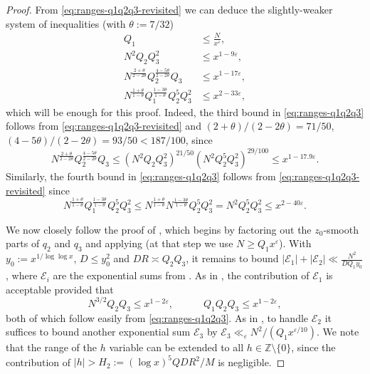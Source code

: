 \documentclass[reqno,11pt]{amsart}
\theoremstyle{remark}
\numberwithin{equation}{section}
\newcommand{\Z}{\mathbb{Z}}
\newcommand{\msE}{\mathscr{E}}
\newcommand{\eps}{\varepsilon}
\begin{document}
\begin{proof}
From \cref{eq:ranges-q1q2q3-revisited} we can deduce the slightly-weaker system of inequalities (with $\theta := 7/32$)
\begin{equation} \label{eq:ranges-q1q2q3}
\begin{aligned}
    Q_1 &\le \frac{N}{x^\eps}, 
    \\
    N^2 Q_2 Q_3^2 &\le x^{1-9\eps},
    \\
    N^{\frac{2+\theta}{2-2\theta}} Q_2^{\frac{4-5\theta}{2-2\theta}} Q_3
    &\le 
    x^{1-17\eps},
    \\ 
    N^{\frac{1+\theta}{1-\theta}} Q_1^{\frac{1-3\theta}{1-\theta}} Q_2^5 Q_3^{2} &\le 
    x^{2-33\eps},
\end{aligned}
\end{equation}
which will be enough for this proof.
Indeed, the third bound in \cref{eq:ranges-q1q2q3} follows from \cref{eq:ranges-q1q2q3-revisited} and $(2+\theta)/(2-2\theta) = 71/50$, $(4-5\theta)/(2-2\theta) = 93/50 < 187/100$, since
\[
    N^{\frac{2+\theta}{2-2\theta}} Q_2^{\frac{4-5\theta}{2-2\theta}} Q_3 
    \le (N^2 Q_2 Q_3^2)^{21/50} (N^2 Q_2^5 Q_3^2)^{29/100} \le x^{1-17.9\eps}.
\]
Similarly, the fourth bound in \cref{eq:ranges-q1q2q3} follows from \cref{eq:ranges-q1q2q3-revisited} since
\[
    N^{\frac{1+\theta}{1-\theta}} Q_1^{\frac{1-3\theta}{1-\theta}} Q_2^5 Q_3^2 \le 
    N^{\frac{1+\theta}{1-\theta}} N^{\frac{1-3\theta}{1-\theta}} Q_2^5 Q_3^2
    =
    N^2 Q_2^5 Q_3^2
    \le
    x^{2-40\eps}.
\]

We now closely follow the proof of \cite[Proposition 7.2]{maynard2025primes2}, which begins by factoring out the $z_0$-smooth parts of $q_2$ and $q_3$ and applying \cite[Proposition 5.8]{maynard2025primes2} (at that step we use $N \ge Q_1 x^\eps$). With $y_0 := x^{1/\log \log x}$, $D \le y_0^2$ and $DR \asymp Q_2 Q_3$, it remains to bound $|\msE_1| + |\msE_2| \ll \frac{N^2}{DQ_1 y_0}$,
where $\msE_i$ are the exponential sums from \cite[p.\,26]{maynard2025primes2}. As in \cite[p.\,27]{maynard2025primes2}, the contribution of $\msE_1$ is acceptable provided that
\[
    N^{3/2}Q_2 Q_3 \le x^{1-2\eps},
    \qquad\quad
    Q_1 Q_2 Q_3 \le x^{1-2\eps},
\]
both of which follow easily from \cref{eq:ranges-q1q2q3}. As in \cite[p.\,27]{maynard2025primes2}, to handle $\msE_2$ it suffices to bound another exponential sum $\msE_3$ by $\msE_3 \ll_\eps N^2/(Q_1 x^{\eps/10})$. We note that the range of the $h$ variable can be extended to all $h \in \Z \setminus \{0\}$, since the contribution of $|h| > H_2 := (\log x)^5 QDR^2/M$ is negligible.


\end{proof}
\end{document}
